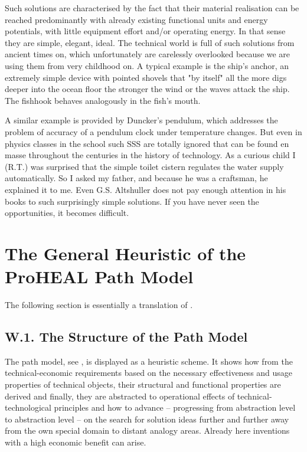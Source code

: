 \documentclass[11pt,a4paper]{article}
\begin{document}
Such solutions are characterised by the fact that their material realisation
can be reached predominantly with already existing functional units and energy
potentials, with little equipment effort and/or operating energy. In that
sense they are simple, elegant, ideal. The technical world is full of such
solutions from ancient times on, which unfortunately are carelessly overlooked
because we are using them from very childhood on. A typical example is the
ship's anchor, an extremely simple device with pointed shovels that "by
itself" all the more digs deeper into the ocean floor the stronger the wind or
the waves attack the ship.  The fishhook behaves analogously in the fish's
mouth.

A similar example is provided by Duncker's pendulum, which addresses the
problem of accuracy of a pendulum clock under temperature changes. But even in
physics classes in the school such SSS are totally ignored that can be found
en masse throughout the centuries in the history of technology. As a curious
child I (R.T.) was surprised that the simple toilet cistern regulates the
water supply automatically.  So I asked my father, and because he was a
craftsman, he explained it to me. Even G.S. Altshuller does not pay enough
attention in his books to such surprisingly simple solutions. If you have
never seen the opportunities, it becomes difficult.
\newpage

\section{The General Heuristic of the ProHEAL Path Model}

The following section is essentially a translation of \cite[ch. 5]{RM-21}.

\subsection*{W.1. The Structure of the Path Model}

The path model, see \cite[Appendix 1]{ProHEAL-21}, is displayed as a heuristic
scheme. It shows how from the technical-economic requirements based on the
necessary effectiveness and usage properties of technical objects, their
structural and functional properties are derived and finally, they are
abstracted to operational effects of technical-technological principles and
how to advance -- progressing from abstraction level to abstraction level --
on the search for solution ideas further and further away from the own special
domain to distant analogy areas.  Already here inventions with a high economic
benefit can arise.
\end{document}
